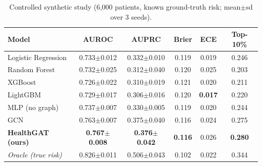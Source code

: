 \begin{table}[t]\centering\caption{Controlled synthetic study (6{,}000 patients, known ground-truth risk; mean$\pm$sd over 3 seeds).}\label{tab:syn}
\footnotesize\setlength{\tabcolsep}{2.5pt}\begin{tabular}{lccccc}\toprule
Model & AUROC & AUPRC & Brier & ECE & Top-10\% \\\midrule
Logistic Regression & 0.733$\pm$0.012 & 0.332$\pm$0.010 & 0.119 & 0.019 & 0.246 \\
Random Forest & 0.732$\pm$0.025 & 0.312$\pm$0.040 & 0.120 & 0.025 & 0.203 \\
XGBoost & 0.726$\pm$0.022 & 0.310$\pm$0.019 & 0.121 & 0.020 & 0.211 \\
LightGBM & 0.729$\pm$0.017 & 0.306$\pm$0.016 & 0.120 & \textbf{0.017} & 0.220 \\
\midrule
MLP (no graph) & 0.737$\pm$0.007 & 0.330$\pm$0.005 & 0.119 & 0.020 & 0.244 \\
GCN & 0.763$\pm$0.007 & 0.375$\pm$0.040 & 0.116 & 0.024 & 0.275 \\
\textbf{HealthGAT (ours)} & \textbf{0.767$\pm$0.008} & \textbf{0.376$\pm$0.042} & \textbf{0.116} & 0.026 & \textbf{0.280} \\
\midrule
\textit{Oracle (true risk)} & 0.826$\pm$0.011 & 0.506$\pm$0.043 & 0.102 & 0.022 & 0.344 \\
\bottomrule\end{tabular}\end{table}
